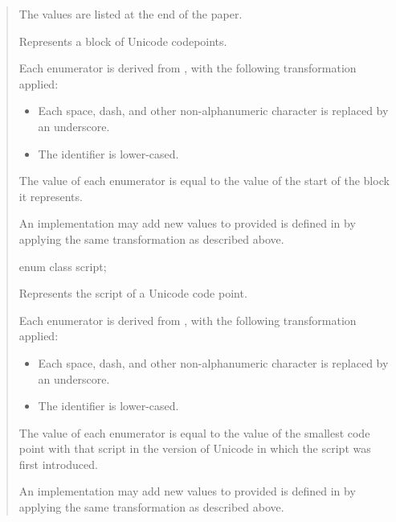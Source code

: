 \documentclass{wg21}
\begin{document}
\begin{quote}
The values are listed at the end of the paper.

\begin{itemdescr}

Represents a block of Unicode codepoints.

Each enumerator is derived from \cite{PropertyValueAliases}, with the following transformation applied:
\begin{itemize}
    \item Each space, dash, and other non-alphanumeric character is replaced by an underscore.
    \item The identifier is lower-cased.
\end{itemize}

The value of each enumerator is equal to the value of the start of the block it represents.

\begin{note}
An implementation may add new values to  provided is defined in \cite{PropertyValueAliases} by applying the same transformation as described above.
\end{note}

\end{itemdescr}


\begin{itemdecl}
enum class script;
\end{itemdecl}

\begin{itemdescr}

Represents the script of a Unicode code point.

Each enumerator is derived from \cite{PropertyValueAliases}, with the following transformation applied:
\begin{itemize}
    \item Each space, dash, and other non-alphanumeric character is replaced by an underscore.
    \item The identifier is lower-cased.
\end{itemize}

The value of each enumerator is equal to the value of the smallest code point with that script in the version of Unicode in which the script was first introduced.

\begin{note}
    An implementation may add new values to  provided is defined in \cite{PropertyValueAliases} by applying the same transformation as described above.
\end{note}


\end{itemdescr}
\end{quote}
\end{document}
